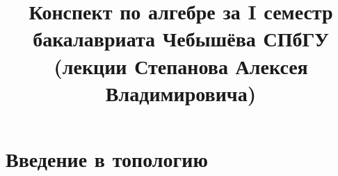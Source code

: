 \documentclass[12pt]{report}
\begin{document}
\renewcommand{\proofname}{Доказательство}

\theoremstyle{plain}
\newtheorem{thm}{Теорема}[section]
\newtheorem*{lm}{Лемма}
\newtheorem*{st}{Утверждение}
\newtheorem*{prop}{Свойства}

\theoremstyle{definition}
\newtheorem{defn}{Определение}
\newtheorem*{ex}{Пример}
\newtheorem*{exs}{Примеры}
\newtheorem*{tasks}{Tasks}
\newtheorem*{cor}{Следствие}
\newtheorem*{name}{Обозначение}

\theoremstyle{remark}
\newtheorem*{rem}{Ремарка}
\newtheorem*{note}{Замечание}
\newtheorem*{probl}{Упражнение}

\newcommand{\Z}{\mathbb{Z}}
\newcommand{\N}{\mathbb{N}}
\newcommand{\R}{\mathbb{R}}
\newcommand{\Q}{\mathbb{Q}}
\newcommand{\K}{\mathbb{K}}
\newcommand{\Cm}{\mathbb{C}}
\newcommand{\Pm}{\mathbb{P}}
\newcommand{\ilim}{\int\limits}
\newcommand{\slim}{\sum\limits}


\title{Конспект по алгебре за I семестр бакалавриата Чебышёва СПбГУ (лекции Степанова Алексея Владимировича)}                      
\maketitle
\clearpage
\tableofcontents
\clearpage
\chapter{Введение в топологию}
\end{document}
